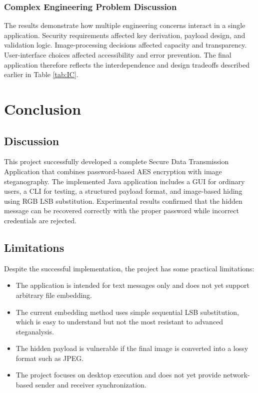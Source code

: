 \documentclass[12pt]{report}
\begin{document}
\subsection{Complex Engineering Problem Discussion}
The results demonstrate how multiple engineering concerns interact in a single application. Security requirements affected key derivation, payload design, and validation logic. Image-processing decisions affected capacity and transparency. User-interface choices affected accessibility and error prevention. The final application therefore reflects the interdependence and design tradeoffs described earlier in Table \ref{tab:IC}.

\newpage
\chapter{Conclusion}

\section{Discussion}
This project successfully developed a complete Secure Data Transmission Application that combines password-based AES encryption with image steganography. The implemented Java application includes a GUI for ordinary users, a CLI for testing, a structured payload format, and image-based hiding using RGB LSB substitution. Experimental results confirmed that the hidden message can be recovered correctly with the proper password while incorrect credentials are rejected.

\section{Limitations}
Despite the successful implementation, the project has some practical limitations:
\begin{itemize}
    \item The application is intended for text messages only and does not yet support arbitrary file embedding.
    \item The current embedding method uses simple sequential LSB substitution, which is easy to understand but not the most resistant to advanced steganalysis.
    \item The hidden payload is vulnerable if the final image is converted into a lossy format such as JPEG.
    \item The project focuses on desktop execution and does not yet provide network-based sender and receiver synchronization.
\end{itemize}
\end{document}
